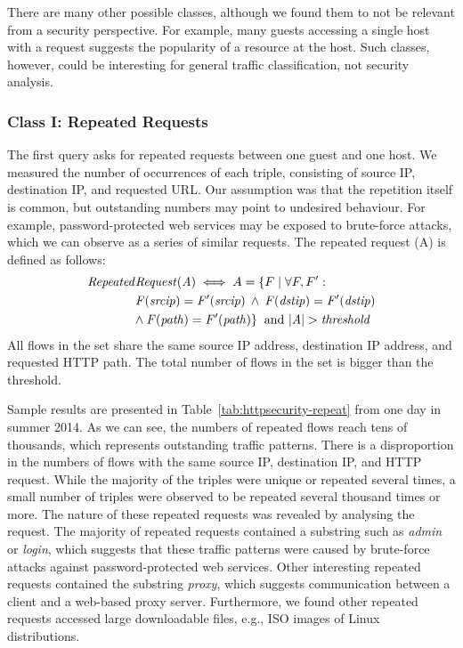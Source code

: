 There are many other possible classes, although we found them to not be relevant from a security perspective. For example, many guests accessing a single host with a request suggests the popularity of a resource at the host. Such classes, however, could be interesting for general traffic classification, not security analysis.

\subsubsection{Class I: Repeated Requests}

The first query asks for repeated requests between one guest and one host. We measured the number of occurrences of each triple, consisting of source IP, destination IP, and requested URL. Our assumption was that the repetition itself is common, but outstanding numbers may point to undesired behaviour. For example, password-protected web services may be exposed to brute-force attacks, which we can observe as a series of similar requests. The repeated request (A) is defined as follows:
\begin{equation*}
\begin{split}
\mathit{Repeated}&\mathit{Request(A)} \iff A = \{F \mid \forall F, F':\\
&\mathit{F(srcip) = F'(srcip) \: \land \: F(dstip) = F'(dstip)}\\
&\mathit{\land \: F(path) = F'(path)\} \: \mbox{ and } |A| > threshold}
\end{split}
\end{equation*}
All flows in the set share the same source IP address, destination IP address, and requested HTTP path. The total number of flows in the set is bigger than the threshold.

Sample results are presented in Table~\ref{tab:httpsecurity-repeat} from one day in summer 2014. As we can see, the numbers of repeated flows reach tens of thousands, which represents outstanding traffic patterns. There is a disproportion in the numbers of flows with the same source IP, destination IP, and HTTP request. While the majority of the triples were unique or repeated several times, a small number of triples were observed to be repeated several thousand times or more. The nature of these repeated requests was revealed by analysing the request. The majority of repeated requests contained a substring such as \textit{admin} or \textit{login}, which suggests that these traffic patterns were caused by brute-force attacks against password-protected web services. Other interesting repeated requests contained the substring \textit{proxy}, which suggests communication between a client and a web-based proxy server. Furthermore, we found other repeated requests accessed large downloadable files, e.g., ISO images of Linux distributions.

